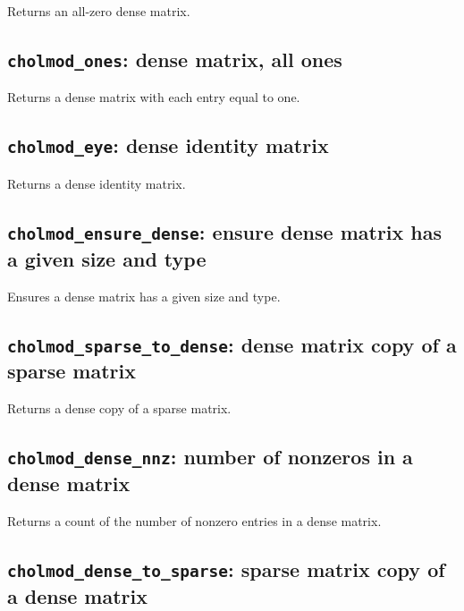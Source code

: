 \documentclass[11pt]{article}
\begin{document}

Returns an all-zero dense matrix.

\subsection{{\tt cholmod\_ones}: dense matrix, all ones}


Returns a dense matrix with each entry equal to one.

\subsection{{\tt cholmod\_eye}: dense identity matrix}


Returns a dense identity matrix.

\subsection{{\tt cholmod\_ensure\_dense}: ensure dense matrix has a given size
and type}


Ensures a dense matrix has a given size and type.

\subsection{{\tt cholmod\_sparse\_to\_dense}: dense matrix copy of a sparse matrix}


Returns a dense copy of a sparse matrix.

\subsection{{\tt cholmod\_dense\_nnz}: number of nonzeros in a dense matrix}


Returns a count of the number of nonzero entries in a dense matrix.

\subsection{{\tt cholmod\_dense\_to\_sparse}: sparse matrix copy of a dense matrix}
\end{document}
